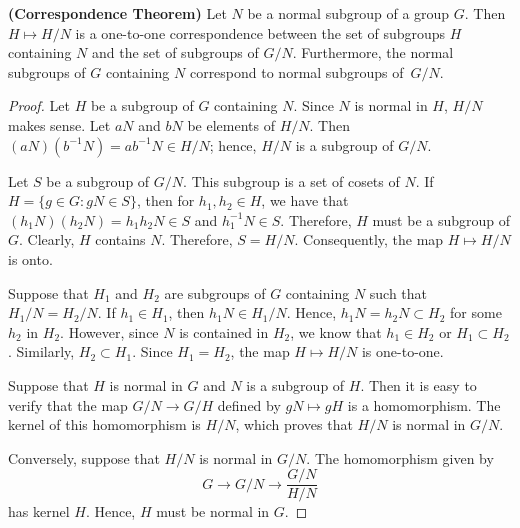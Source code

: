  
\begin{theorem} \textbf{(Correspondence Theorem)}\label{CorrespondTheorem}
Let $N$ be a normal subgroup of a group $G$. Then $H \mapsto H/N$
is a one-to-one correspondence between the set of subgroups $H$
containing $N$  and the set of subgroups of $G/N$. Furthermore, the
normal subgroups of $G$ containing $N$ correspond to normal subgroups of~$G/N$. 
\end{theorem}

 
 
\begin{proof}
Let $H$ be a subgroup of $G$ containing $N$. Since $N$ is normal in
$H$, $H/N$ makes sense.  Let $aN$ and $bN$ be elements of $H/N$. Then
$(aN)( b^{-1} N )= ab^{-1}N \in H/N$; hence, $H/N$ is a subgroup of
$G/N$. 


Let $S$ be a subgroup of $G/N$. This subgroup is a set of cosets of
$N$.  If  $H= \{ g \in G : gN \in S \}$, then for $h_1, h_2 \in H$, we
have that $(h_1 N)( h_2 N )= h_1 h_2 N \in S$ and $h_1^{-1} N \in S$.
Therefore, $H$ must be a subgroup of $G$. Clearly, $H$ contains $N$.
Therefore, $S = H / N$. Consequently, the map  $H \mapsto H/N$ is
onto. 

    
Suppose that $H_1$ and $H_2$ are subgroups of $G$ containing $N$ such
that $H_1/N = H_2/N$. If $h_1 \in H_1$, then $h_1 N \in H_1/N$. Hence,
$h_1 N = h_2 N \subset H_2$ for some $h_2$ in $H_2$. However, since
$N$ is contained in $H_2$, we know that $h_1 \in H_2$ or $H_1 \subset
H_2$. Similarly, $H_2 \subset H_1$.  Since $H_1 = H_2$, the map  $H
\mapsto H/N$ is one-to-one. 




 
Suppose that $H$ is normal in $G$ and $N$ is a subgroup of $H$.  Then
it is easy to verify that the map $G/N \rightarrow G/H$ defined by $gN
\mapsto gH$ is  a homomorphism.  The kernel of this homomorphism is
$H/N$, which proves that $H/N$ is normal in $G/N$. 
 
 
Conversely, suppose that $H/N$ is normal in $G/N$. The homomorphism
given by 
\[
G \rightarrow G/N \rightarrow \frac{G/N}{H/N}
\]
has kernel $H$. Hence, $H$ must be normal in $G$.
\end{proof}
 
